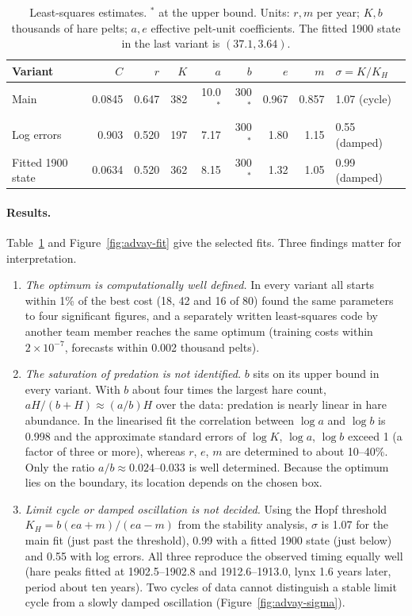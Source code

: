 \begin{table}[ht]
\centering
\begin{tabular}{lrrrrrrrl}
\toprule
Variant & $C$ & $r$ & $K$ & $a$ & $b$ & $e$ & $m$ & $\sigma=K/K_H$\\
\midrule
Main & 0.0845 & 0.647 & 382 & 10.0$^*$ & 300$^*$ & 0.967 & 0.857 & 1.07 (cycle)\\
Log errors & 0.903 & 0.520 & 197 & 7.17 & 300$^*$ & 1.80 & 1.15 & 0.55 (damped)\\
Fitted 1900 state & 0.0634 & 0.520 & 362 & 8.15 & 300$^*$ & 1.32 & 1.05 & 0.99 (damped)\\
\bottomrule
\end{tabular}
\caption{Least-squares estimates. $^*$ at the upper bound. Units: $r,m$ per year; $K,b$
thousands of hare pelts; $a,e$ effective pelt-unit coefficients. The fitted 1900 state in the
last variant is $(37.1,3.64)$.}\label{tab:advay-ls}
\end{table}

\paragraph{Results.} Table~\ref{tab:advay-ls} and Figure~\ref{fig:advay-fit} give the selected
fits. Three findings matter for interpretation.
\begin{enumerate}
\item \emph{The optimum is computationally well defined.} In every variant all starts within
1\% of the best cost (18, 42 and 16 of 80) found the same parameters to four significant
figures, and a separately written least-squares code by another team member reaches the same
optimum (training costs within $2\times10^{-7}$, forecasts within 0.002 thousand pelts).
\item \emph{The saturation of predation is not identified.} $b$ sits on its upper bound in
every variant. With $b$ about four times the largest hare count, $aH/(b+H)\approx(a/b)H$ over
the data: predation is nearly linear in hare abundance. In the linearised fit the
correlation between $\log a$ and $\log b$ is 0.998 and the approximate standard errors of
$\log K$, $\log a$, $\log b$ exceed 1 (a factor of three or more), whereas $r$, $e$, $m$ are
determined to about 10--40\%. Only the ratio $a/b\approx0.024$--$0.033$ is well determined.
Because the optimum lies on the boundary, its location depends on the chosen box.
\item \emph{Limit cycle or damped oscillation is not decided.} Using the Hopf threshold
$K_H=b(ea+m)/(ea-m)$ from the stability analysis, $\sigma$ is 1.07 for the main fit (just past the threshold),
0.99 with a fitted 1900 state (just below) and 0.55 with log errors. All three reproduce the
observed timing equally well (hare peaks fitted at 1902.5--1902.8 and 1912.6--1913.0, lynx
1.6 years later, period about ten years). Two cycles of data cannot distinguish a stable
limit cycle from a slowly damped oscillation (Figure~\ref{fig:advay-sigma}).
\end{enumerate}

